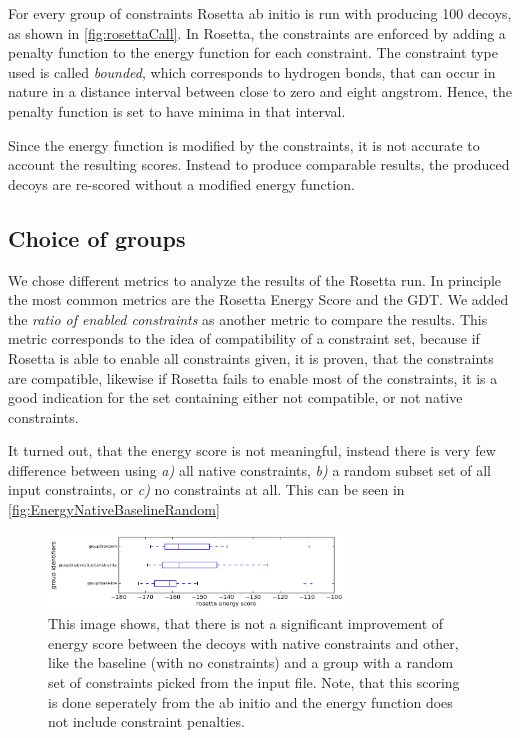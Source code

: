 \documentclass[a4paper, 11pt, parskip=half]{scrartcl}
\begin{document}
For every group of constraints Rosetta ab initio is run with producing 100 decoys, as shown in \autoref{fig:rosettaCall}. In Rosetta, the constraints are enforced by adding a penalty function to the energy function for each constraint. The constraint type used is called \emph{bounded}, which corresponds to hydrogen bonds, that can occur in nature in a distance interval between close to zero and eight angstrom. Hence, the penalty function is set to have minima in that interval.

Since the energy function is modified by the constraints, it is not accurate to account the resulting scores. Instead to produce comparable results, the produced decoys are re-scored without a modified energy function.

\subsection{Choice of groups}
We chose different metrics to analyze the results of the Rosetta run. In principle the most common metrics are the Rosetta Energy Score and the GDT. %
We added the \emph{ratio of enabled constraints} as another metric to compare the results. This metric corresponds to the idea of compatibility of a constraint set, because if Rosetta is able to enable all constraints given, it is proven, that the constraints are compatible, likewise if Rosetta fails to enable most of the constraints, it is a good indication for the set containing either not compatible, or not native constraints.

It turned out, that the energy score is not meaningful, instead there is very few difference between using \emph{a)} all native constraints, \emph{b)} a random subset set of all input constraints, or \emph{c)} no constraints at all. This can be seen in \autoref{fig:EnergyNativeBaselineRandom}\\
\begin{figure}
    \centering
    \includegraphics[width=0.7\textwidth]{EnergyNativeBaselineRandom.png}
    \caption{This image shows, that there is not a significant improvement of energy score between the decoys with native constraints and other, like the baseline (with no constraints) and a group with a random set of constraints picked from the input file. Note, that this scoring is done seperately from the ab initio and the energy function does not include constraint penalties.}
    \label{fig:EnergyNativeBaselineRandom}
\end{figure}
    
\end{document}
